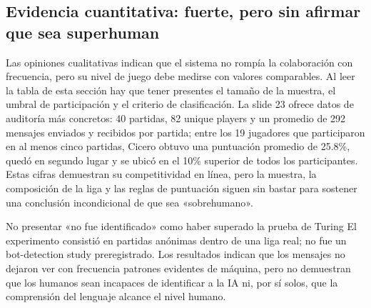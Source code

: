 
\subsection{Evidencia cuantitativa: fuerte, pero sin afirmar que sea superhuman}

Las opiniones cualitativas indican que el sistema no rompía la colaboración con frecuencia, pero su nivel de juego debe medirse con valores comparables. Al leer la tabla de esta sección hay que tener presentes el tamaño de la muestra, el umbral de participación y el criterio de clasificación. La slide 23 ofrece datos de auditoría más concretos: 40 partidas, 82 unique players y un promedio de 292 mensajes enviados y recibidos por partida; entre los 19 jugadores que participaron en al menos cinco partidas, Cicero obtuvo una puntuación promedio de 25.8\%, quedó en segundo lugar y se ubicó en el 10\% superior de todos los participantes. Estas cifras demuestran su competitividad en línea, pero la muestra, la composición de la liga y las reglas de puntuación siguen sin bastar para sostener una conclusión incondicional de que sea «sobrehumano».


\begin{warningbox}{No presentar «no fue identificado» como haber superado la prueba de Turing}
El experimento consistió en partidas anónimas dentro de una liga real; no fue un bot-detection study preregistrado. Los resultados indican que los mensajes no dejaron ver con frecuencia patrones evidentes de máquina, pero no demuestran que los humanos sean incapaces de identificar a la IA ni, por sí solos, que la comprensión del lenguaje alcance el nivel humano.
\end{warningbox}


